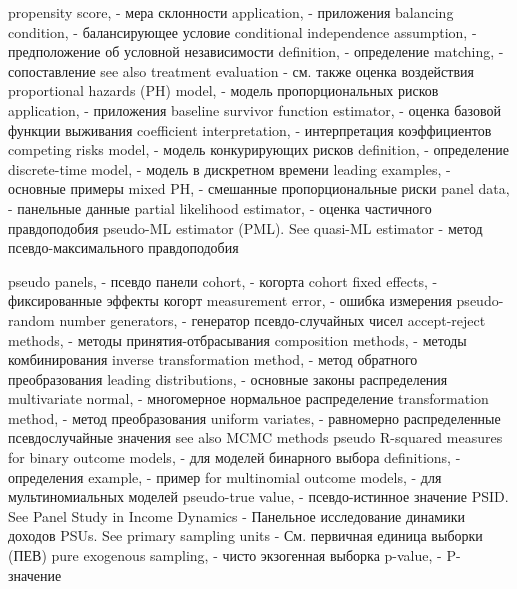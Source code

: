 propensity score, - мера склонности
application, - приложения
balancing condition,  - балансирующее условие
conditional independence assumption, - предположение об условной независимости
definition, - определение
matching, - сопоставление
see also treatment evaluation - см. также оценка воздействия
proportional hazards (PH) model, - модель пропорциональных рисков
application, - приложения
baseline survivor function estimator, - оценка базовой функции выживания 
coefficient interpretation, - интерпретация коэффициентов
competing risks model, - модель конкурирующих рисков 
definition, - определение
discrete-time model, - модель в дискретном времени
leading examples, - основные примеры
mixed PH, - смешанные пропорциональные риски
panel data, - панельные данные
partial likelihood estimator, - оценка частичного правдоподобия
pseudo-ML estimator (PML). See quasi-ML estimator - метод псевдо-максимального правдоподобия

pseudo panels, - псевдо панели
cohort, - когорта
cohort fixed effects, - фиксированные эффекты когорт
measurement error, - ошибка измерения
pseudo-random number generators, - генератор псевдо-случайных чисел
accept-reject methods, - методы принятия-отбрасывания
composition methods, - методы комбинирования
inverse transformation method, - метод обратного преобразования
leading distributions, - основные законы распределения
multivariate normal, - многомерное нормальное распределение
transformation method, - метод преобразования
uniform variates, - равномерно распределенные псевдослучайные значения
see also MCMC methods pseudo R-squared measures
for binary outcome models, - для моделей бинарного выбора
definitions, - определения
example, - пример
for multinomial outcome models, - для мультиномиальных моделей
pseudo-true value, - псевдо-истинное значение
PSID. See Panel Study in Income Dynamics - Панельное исследование динамики доходов
PSUs. See primary sampling units - См. первичная единица выборки (ПЕВ)
pure exogenous sampling, - чисто экзогенная выборка
p-value, - P-значение

